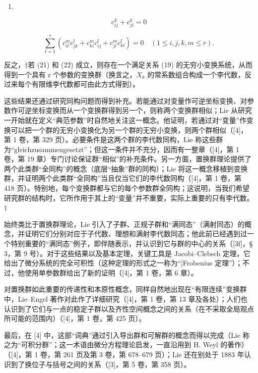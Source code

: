 \begin{enumerate}
\def\labelenumi{(\arabic{enumi})}
\setcounter{enumi}{20}
\tightlist
\item
\end{enumerate}

\[
c _ {i j} ^ {k} + c _ {j i} ^ {k} = 0\tag{22}
\]

\[
\sum_ {l = 1} ^ {r} \left(c _ {i l} ^ {m} c _ {j k} ^ {l} + c _ {k i} ^ {m} c _ {i j} ^ {l} + c _ {j l} ^ {m} c _ {k l} ^ {l}\right) = 0 \quad (1 \leqslant i, j, k, m \leqslant r).
\]

反之，†若 (21) 和 (22) 成立，则存在一个满足关系 (19) 的无穷小变换系统，从而得到一个具有 r 个参数的变换群（换言之，\(X_{k}\) 的常系数组合构成一个李代数，反过来每个有限维李代数都可由此方式得到）。

这些结果还通过研究同构问题而得到补充。若能通过对变量作可逆坐标变换、对参数作可逆坐标变换而从一个变换群得到另一个，则称两个变换群相似；Lie 从研究一开始就在定义“典范参数”时自然地关注这一概念。他证明，若通过对“变量”作变换可以把一个群的无穷小变换化为另一个群的无穷小变换，则两个群相似（{[}4{]}，第 1 卷，第 329 页）。必要条件是这两个群的李代数同构，Lie 称这些群为“gleichzusammengesetzt”；但这一条件并不充分，因而有一整章（{[}4{]}，第 1 卷，第 19 章）专门讨论保证群“相似”的补充条件。另一方面，置换群理论提供了两个此类群“全同构”的概念（底层“抽象”群的同构）；Lie 将这一概念移植到变换群，并证明两个此类群“全同构”当且仅当它们的李代数同构（{[}4{]}，第 1 卷，第 418 页）。特别地，每个变换群都与它的每个参数群全同构；这说明，当我们希望研究群的结构时，它所作用于其上的“变量”并不重要，实际上重要的只有李代数。†

始终类比于置换群理论，Lie 引入了子群、正规子群和“满同态”（满射同态）的概念，并证明它们分别对应于子代数、理想和满射李代数同态；他此前已经遇到过一个特别重要的“满同态”例子，即伴随表示，并认识到它与群的中心的关系（{[}3f{]}，§ 3，第 9 号）。对于这些结果以及基本定理，关键工具是 Jacobi--Clebsch 定理，它给出了微分系统的完全可积性（这种定理的形式之一称为“{[}Frobenius 定理”）；不过，他使用单参数群给出了新的证明（{[}4{]}，第 1 卷，第 6 章）。

对置换群如此重要的传递性和本原性概念，同样自然地出现在“有限连续”变换群中，Lie--Engel 著作对此作了详细研究（{[}4{]}，第 1 卷，第 13 章及各处）；人们也认识到了它们与一点的稳定子群以及齐性空间概念之间的关系（在不采取全局观点所可能的范围内）（{[}4{]}，第 1 卷，第 425 页）。

最后，在 {[}4{]} 中，这部“词典”通过引入导出群和可解群的概念而得以完成（Lie 称之为“可积分群”；这一术语由微分方程理论启发，一直沿用到 H. Weyl 的著作）（{[}4{]}，第 1 卷，第 261 页及第 3 卷，第 678--679 页）；Lie 还在别处于 1883 年认识到了换位子与括号之间的关系（{[}3{]}，第 5 卷，第 358 页）。

